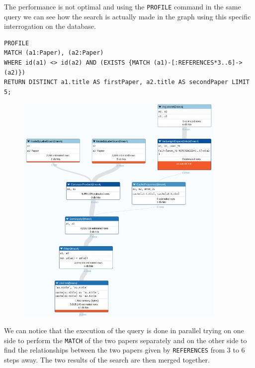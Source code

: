 \begin{enumerate}
\begin{figure}[H]
\begin{center}
            \label{fig:query8neo4j}%
        \end{center}
    \end{figure}
    The performance is not optimal and using the \verb|PROFILE| command in the same query we can see how the search is actually made in the graph using this specific interrogation on the database.
    \begin{lstlisting}[label={lst:profile_query8neo4j1}]
PROFILE
MATCH (a1:Paper), (a2:Paper)
WHERE id(a1) <> id(a2) AND (EXISTS {MATCH (a1)-[:REFERENCES*3..6]->(a2)})
RETURN DISTINCT a1.title AS firstPaper, a2.title AS secondPaper LIMIT 5;
    \end{lstlisting}
    \begin{figure}[H]
        \begin{center}
            \includegraphics[width=0.9\textwidth]{Images/profile_query8neo4j1}
            \label{fig:profile_query8neo4j1}%
        \end{center}
    \end{figure}
    We can notice that the execution of the query is done in parallel trying on one side to perform the \verb|MATCH| of the two papers separately and on the other side to find the relationships between the two papers given by \verb|REFERENCES| from 3 to 6 steps away.
    The two results of the search are then merged together. \\

\end{enumerate}
